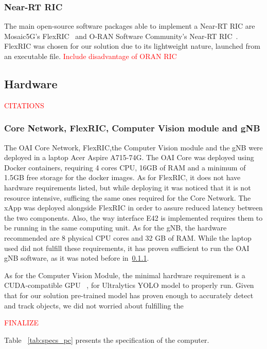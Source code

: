 \subsubsection{Near-RT RIC}
The main open-source software packages able to implement a Near-RT RIC are Mosaic5G’s FlexRIC~\cite[]{} and  O-RAN Software Community’s Near-RT RIC~\cite[]{}.
FlexRIC was chosen for our solution due to its lightweight nature, launched from an executable file.
\textcolor{red}{Include disadvantage of ORAN RIC}

\subsection{Hardware}\label{subsec:hardware}

\textcolor{red}{CITATIONS}
\subsubsection{Core Network, FlexRIC, Computer Vision module and gNB}
The OAI Core Network, FlexRIC,the Computer Vision module and the gNB were deployed in a laptop Acer Aspire A715-74G\@.
The OAI Core was deployed using Docker containers, requiring 4 cores CPU, 16GB of RAM and a minimum of 1.5GB free storage for the docker images.
As for FlexRIC, it does not have hardware requirements listed, but while deploying it was noticed that it is not resource intensive, sufficing the same ones required for the Core Network.
The xApp was deployed alongside FlexRIC in order to assure reduced latency between the two components.
Also,  the way interface E42 is implemented requires them to be running in the same computing unit.
As for the gNB, the hardware recommended are 8 physical CPU cores and 32 GB of RAM\@.
While the laptop used did not fulfill these requirements, it has proven sufficient to run the OAI gNB software, as it was noted before in~\ref{}. %

As for the Computer Vision Module, the minimal hardware requirement is a CUDA-compatible GPU ~\cite{}, for Ultralytics YOLO model to properly run.
Given that for our solution pre-trained model has proven enough to accurately detect and track objects, we did not worried about fulfilling the

\textcolor{red}{FINALIZE}



Table ~\ref{tab:specs_pc} presents the specification of the computer.

